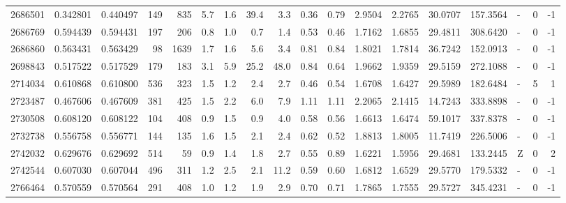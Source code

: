 \begin{tabular}{rrrrrrrrrrrrrrrlrr}
   2686501 & 0.342801 &   0.440497 &  149 &  835 &      5.7 &      1.6 &    39.4 &      3.3 &       0.36 &        0.79 &  2.9504 &  2.2765 &   30.0707 &  157.3564 &             - &        0 &         -1 \\
   2686769 & 0.594439 &   0.594431 &  197 &  206 &      0.8 &      1.0 &     0.7 &      1.4 &       0.53 &        0.46 &  1.7162 &  1.6855 &   29.4811 &  308.6420 &             - &        0 &         -1 \\
   2686860 & 0.563431 &   0.563429 &   98 & 1639 &      1.7 &      1.6 &     5.6 &      3.4 &       0.81 &        0.84 &  1.8021 &  1.7814 &   36.7242 &  152.0913 &             - &        0 &         -1 \\
   2698843 & 0.517522 &   0.517529 &  179 &  183 &      3.1 &      5.9 &    25.2 &     48.0 &       0.84 &        0.64 &  1.9662 &  1.9359 &   29.5159 &  272.1088 &             - &        0 &         -1 \\
   2714034 & 0.610868 &   0.610800 &  536 &  323 &      1.5 &      1.2 &     2.4 &      2.7 &       0.46 &        0.54 &  1.6708 &  1.6427 &   29.5989 &  182.6484 &             - &        5 &          1 \\
   2723487 & 0.467606 &   0.467609 &  381 &  425 &      1.5 &      2.2 &     6.0 &      7.9 &       1.11 &        1.11 &  2.2065 &  2.1415 &   14.7243 &  333.8898 &             - &        0 &         -1 \\
   2730508 & 0.608120 &   0.608122 &  104 &  408 &      0.9 &      1.5 &     0.9 &      4.0 &       0.58 &        0.56 &  1.6613 &  1.6474 &   59.1017 &  337.8378 &             - &        0 &         -1 \\
   2732738 & 0.556758 &   0.556771 &  144 &  135 &      1.6 &      1.5 &     2.1 &      2.4 &       0.62 &        0.52 &  1.8813 &  1.8005 &   11.7419 &  226.5006 &             - &        0 &         -1 \\
   2742032 & 0.629676 &   0.629692 &  514 &   59 &      0.9 &      1.4 &     1.8 &      2.7 &       0.55 &        0.89 &  1.6221 &  1.5956 &   29.4681 &  133.2445 &             Z &        0 &          2 \\
   2742544 & 0.607030 &   0.607044 &  496 &  311 &      1.2 &      2.5 &     2.1 &     11.2 &       0.59 &        0.60 &  1.6812 &  1.6529 &   29.5770 &  179.5332 &             - &        0 &         -1 \\
   2766464 & 0.570559 &   0.570564 &  291 &  408 &      1.0 &      1.2 &     1.9 &      2.9 &       0.70 &        0.71 &  1.7865 &  1.7555 &   29.5727 &  345.4231 &             - &        0 &         -1 \\

\end{tabular}
